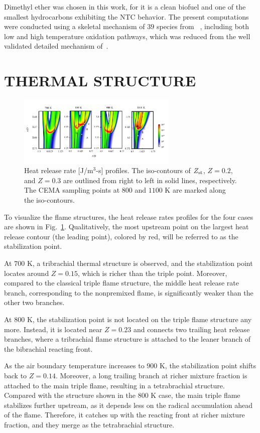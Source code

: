 \documentclass[twocolumn,10pt]{hphrc}
\begin{document}
Dimethyl ether was chosen in this work, for it is a clean biofuel and one of the smallest hydrocarbons exhibiting the NTC behavior.  The present computations were conducted using a skeletal mechanism of $39$ species from ~\cite{bansal11}, including both low and high temperature oxidation pathways, which was reduced from the well validated detailed mechanism of~\cite{zhao08}.

\section*{THERMAL STRUCTURE}

\begin{figure}[h]
  \centering
  \includegraphics[width=3in]{HRR}
  \caption{Heat release rate [J/m$^3$-s] profiles.  The iso-contours of $Z_{\rm st}$, $Z = 0.2$, and $Z = 0.3$ are outlined from right to left in solid lines, respectively.  The CEMA sampling points at $800$ and $1100$ K are marked along the iso-contours.}
  \label{fig:HRR}
\end{figure}

To visualize the flame structures, the heat release rates profiles for the four cases are shown in Fig.~\ref{fig:HRR}.  Qualitatively, the most upstream point on the largest heat release contour (the leading point), colored by red, will be referred to as the stabilization point.

At $700$ K, a tribrachial thermal structure is observed, and the stabilization point locates around $Z = 0.15$, which is richer than the triple point.  Moreover, compared to the classical triple flame structure, the middle heat release rate branch, corresponding to the nonpremixed flame, is significantly weaker than the other two branches. 

At $800$ K, the stabilization point is not located on the triple flame structure any more.  Instead, it is located near $Z = 0.23$ and connects two trailing heat release branches, where a tribrachial flame structure is attached to the leaner branch of the bibrachial reacting front.

As the air boundary temperature increases to $900$ K, the stabilization point shifts back to $Z = 0.14$.  Moreover, a long trailing branch at richer mixture fraction is attached to the main triple flame, resulting in a tetrabrachial structure.  Compared with the structure shown in the $800$ K case, the main triple flame stabilizes further upstream, as it depends less on the radical accumulation ahead of the flame.  Therefore, it catches up with the reacting front at richer mixture fraction, and they merge as the tetrabrachial structure.
\end{document}
